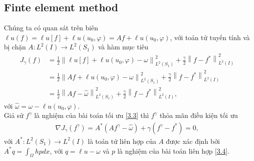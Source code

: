\documentclass[]{article}
\begin{document}
\subsection{Finte element method}
\qquad Chúng ta có quan sát trên biên $\ell u(f)=\ell u[f]+\ell u(u_0, \varphi)=Af+\ell u(u_0, \varphi)$, với toán tử tuyến tính và bị chặn $A: L^2(I)\to L^2(S_1)$ và hàm mục tiêu
\begin{align*}
	J_\gamma(f)&=\frac{1}{2}\left\|\ell u[f]+\ell u(u_0, \varphi)-\omega\right\|^2_{L^2(S_1)}+\frac{\gamma}{2}\left\|f-f^*\right\|^2_{L^2(I)}\\
	&=\frac{1}{2}\left\|Af+\ell u(u_0, \varphi)-\omega\right\|^2_{L^2(S_1)}+\frac{\gamma}{2}\left\|f-f^*\right\|^2_{L^2(I)}\\
	&=\frac{1}{2}\left\|Af-\hat{\omega}\right\|^2_{L^2(S_1)}+\frac{\gamma}{2}\left\|f-f^*\right\|^2_{L^2(I)},
\end{align*}
với $\hat{\omega}=\omega-\ell u(u_0, \varphi)$.
\\
Giả sử $f^\gamma$ là nghiệm của bài toán tối ưu \eqref{3.3} thì $f^\gamma$ thỏa mãn điều kiện tối ưu
\begin{align}\label{3.8}
	\nabla J_\gamma(f^\gamma)= A^*(Af^\gamma-\hat{\omega})+\gamma(f^\gamma-f^*)=0,
\end{align}
với $A^*: L^2(S_1)\to L^2(I)$ là toán tử liên hợp của $A$ được xác định bởi $A^*q=\int_\Omega hpdx$, với $q=\ell u-\omega$ và $p$ là nghiệm của bài toán liên hợp \eqref{3.4}.
\end{document}

